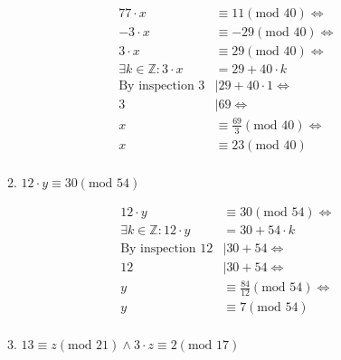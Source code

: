 \documentclass[10pt,\jkfside,a4paper]{article}
\begin{document}
\begin{enumerate}
\begin{enumerate}
\begin{equation}
\begin{split}
77\cdot x &\equiv 11 (\text{mod } 40)\Longleftrightarrow\\
-3\cdot x &\equiv -29 (\text{mod } 40)\Longleftrightarrow\\
3\cdot x &\equiv 29 (\text{mod } 40)\Longleftrightarrow\\
\exists k \in \mathbb{Z}: 3\cdot x &= 29 + 40\cdot k\\
\text{By inspection } 3 &| 29 + 40\cdot 1\Longleftrightarrow\\
3 &| 69\Longleftrightarrow\\
x &\equiv \frac{69}{3}(\text{mod } 40)\Longleftrightarrow\\
x &\equiv 23(\text{mod } 40)\\
\end{split}
\end{equation}

\item $12\cdot y \equiv 30 (\text{mod } 54)$

\begin{equation}
\begin{split}
12\cdot y &\equiv 30(\text{mod } 54)\Longleftrightarrow\\
\exists k \in \mathbb{Z}: 12\cdot y &= 30 + 54\cdot k\\
\text{By inspection } 12 &| 30 + 54 \Longleftrightarrow\\
12 &| 30 + 54 \Longleftrightarrow\\
y &\equiv \frac{84}{12}(\text{mod } 54)\Longleftrightarrow\\
y &\equiv 7(\text{mod } 54)\\
\end{split}
\end{equation}

\item $13 \equiv z (\text{mod } 21) \wedge 3 \cdot z \equiv 2 (\text{mod } 17)$


\end{enumerate}
\end{enumerate}
\end{document}
